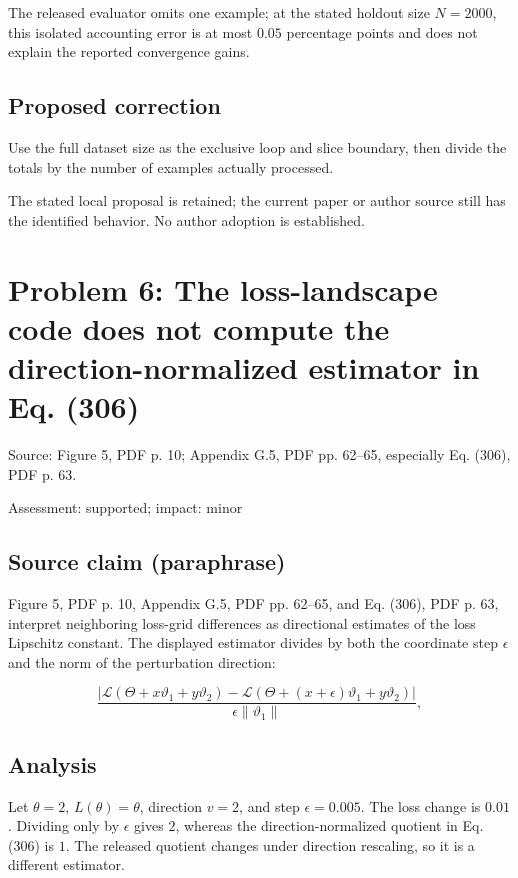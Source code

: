 \documentclass[11pt]{article}
\begin{document}
The released evaluator omits one example; at the stated holdout size \(N=2000\), this isolated accounting error is at most \(0.05\) percentage points and does not explain the reported convergence gains.

\subsection*{Proposed correction}

Use the full dataset size as the exclusive loop and slice boundary, then divide the totals by the number of examples actually processed.

The stated local proposal is retained; the current paper or author source still has the identified behavior. No author adoption is established.

\section*{Problem 6: The loss-landscape code does not compute the direction-normalized estimator in Eq. (306)}

Source: Figure 5, PDF p. 10; Appendix G.5, PDF pp. 62–65, especially Eq. (306), PDF p. 63.

Assessment: supported; impact: minor

\subsection*{Source claim (paraphrase)}

Figure 5, PDF p. 10, Appendix G.5, PDF pp. 62–65, and Eq. (306), PDF p. 63, interpret neighboring loss-grid differences as directional estimates of the loss Lipschitz constant. The displayed estimator divides by both the coordinate step \(\epsilon\) and the norm of the perturbation direction:

\[ \frac{|\mathcal L(\Theta+x\vartheta_1+y\vartheta_2) -\mathcal L(\Theta+(x+\epsilon)\vartheta_1+y\vartheta_2)|} {\epsilon\|\vartheta_1\|}, \]

\subsection*{Analysis}

Let \(\theta=2\), \(L(\theta)=\theta\), direction \(v=2\), and step \(\epsilon=0.005\). The loss change is \(0.01\). Dividing only by \(\epsilon\) gives \(2\), whereas the direction-normalized quotient in Eq. (306) is \(1\). The released quotient changes under direction rescaling, so it is a different estimator.
\end{document}
